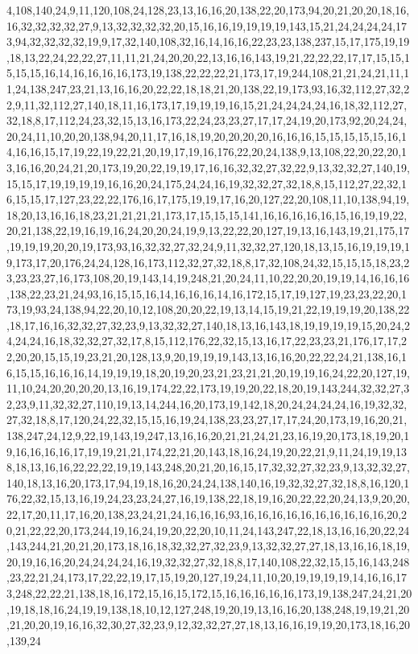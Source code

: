 4,108,140,24,9,11,120,108,24,128,23,13,16,16,20,138,22,20,173,94,20,21,20,20,18,16,16,32,32,32,32,27,9,13,32,32,32,32,20,15,16,16,19,19,19,19,143,15,21,24,24,24,24,173,94,32,32,32,32,19,9,17,32,140,108,32,16,14,16,16,22,23,23,138,237,15,17,175,19,19,18,13,22,24,22,22,27,11,11,21,24,20,20,22,13,16,16,143,19,21,22,22,22,17,17,15,15,15,15,15,16,14,16,16,16,16,173,19,138,22,22,22,21,173,17,19,244,108,21,21,24,21,11,11,24,138,247,23,21,13,16,16,20,22,22,18,18,21,20,138,22,19,173,93,16,32,112,27,32,22,9,11,32,112,27,140,18,11,16,173,17,19,19,19,16,15,21,24,24,24,24,16,18,32,112,27,32,18,8,17,112,24,23,32,15,13,16,173,22,24,23,23,27,17,17,24,19,20,173,92,20,24,24,20,24,11,10,20,20,138,94,20,11,17,16,18,19,20,20,20,20,16,16,16,15,15,15,15,15,16,14,16,16,15,17,19,22,19,22,21,20,19,17,19,16,176,22,20,24,138,9,13,108,22,20,22,20,13,16,16,20,24,21,20,173,19,20,22,19,19,17,16,16,32,32,27,32,22,9,13,32,32,27,140,19,15,15,17,19,19,19,19,16,16,20,24,175,24,24,16,19,32,32,27,32,18,8,15,112,27,22,32,16,15,15,17,127,23,22,22,176,16,17,175,19,19,17,16,20,127,22,20,108,11,10,138,94,19,18,20,13,16,16,18,23,21,21,21,21,173,17,15,15,15,141,16,16,16,16,16,15,16,19,19,22,20,21,138,22,19,16,19,16,24,20,20,24,19,9,13,22,22,20,127,19,13,16,143,19,21,175,17,19,19,19,20,20,19,173,93,16,32,32,27,32,24,9,11,32,32,27,120,18,13,15,16,19,19,19,19,173,17,20,176,24,24,128,16,173,112,32,27,32,18,8,17,32,108,24,32,15,15,15,18,23,23,23,23,27,16,173,108,20,19,143,14,19,248,21,20,24,11,10,22,20,20,19,19,14,16,16,16,138,22,23,21,24,93,16,15,15,16,14,16,16,16,14,16,172,15,17,19,127,19,23,23,22,20,173,19,93,24,138,94,22,20,10,12,108,20,20,22,19,13,14,15,19,21,22,19,19,19,20,138,22,18,17,16,16,32,32,27,32,23,9,13,32,32,27,140,18,13,16,143,18,19,19,19,19,15,20,24,24,24,24,16,18,32,32,27,32,17,8,15,112,176,22,32,15,13,16,17,22,23,23,21,176,17,17,22,20,20,15,15,19,23,21,20,128,13,9,20,19,19,19,143,13,16,16,20,22,22,24,21,138,16,16,15,15,16,16,16,14,19,19,19,18,20,19,20,23,21,23,21,21,20,19,19,16,24,22,20,127,19,11,10,24,20,20,20,20,13,16,19,174,22,22,173,19,19,20,22,18,20,19,143,244,32,32,27,32,23,9,11,32,32,27,110,19,13,14,244,16,20,173,19,142,18,20,24,24,24,24,16,19,32,32,27,32,18,8,17,120,24,22,32,15,15,16,19,24,138,23,23,27,17,17,24,20,173,19,16,20,21,138,247,24,12,9,22,19,143,19,247,13,16,16,20,21,21,24,21,23,16,19,20,173,18,19,20,19,16,16,16,16,17,19,19,21,21,174,22,21,20,143,18,16,24,19,20,22,21,9,11,24,19,19,138,18,13,16,16,22,22,22,19,19,143,248,20,21,20,16,15,17,32,32,27,32,23,9,13,32,32,27,140,18,13,16,20,173,17,94,19,18,16,20,24,24,138,140,16,19,32,32,27,32,18,8,16,120,176,22,32,15,13,16,19,24,23,23,24,27,16,19,138,22,18,19,16,20,22,22,20,24,13,9,20,20,22,17,20,11,17,16,20,138,23,24,21,24,16,16,16,93,16,16,16,16,16,16,16,16,16,16,20,20,21,22,22,20,173,244,19,16,24,19,20,22,20,10,11,24,143,247,22,18,13,16,16,20,22,24,143,244,21,20,21,20,173,18,16,18,32,32,27,32,23,9,13,32,32,27,27,18,13,16,16,18,19,20,19,16,16,20,24,24,24,24,16,19,32,32,27,32,18,8,17,140,108,22,32,15,15,16,143,248,23,22,21,24,173,17,22,22,19,17,15,19,20,127,19,24,11,10,20,19,19,19,19,14,16,16,173,248,22,22,21,138,18,16,172,15,16,15,172,15,16,16,16,16,16,173,19,138,247,24,21,20,19,18,18,16,24,19,19,138,18,10,12,127,248,19,20,19,13,16,16,20,138,248,19,19,21,20,21,20,20,19,16,16,32,30,27,32,23,9,12,32,32,27,27,18,13,16,16,19,19,20,173,18,16,20,139,24